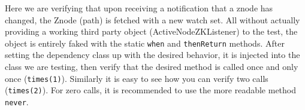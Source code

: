Here we are verifying that upon receiving a notification that a znode has changed, the Znode (path) is fetched with a new watch set.
All without actually providing a working third party object (ActiveNodeZKListener) to the test, the object is entirely faked with the static \texttt{when} and \texttt{thenReturn} methods. After setting the dependency class up with the desired behavior, it is injected into the class we are testing, then verify that the desired method is called once and only once (\texttt{times(1)}). Similarly it is easy to see how you can verify two calls (\texttt{times(2)}). For zero calls, it is recommended to use the more readable method \texttt{never}.

